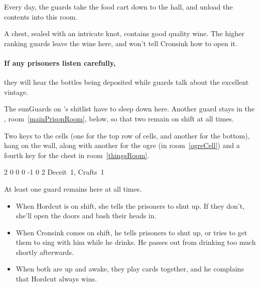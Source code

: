 
Every day, the guards take the food cart down to the hall, and unload the contents into this room.

A chest, sealed with an intricate knot, contains good quality wine.
The higher ranking guards leave the wine here, and won't tell Cronsink how to open it.

\paragraph{If any prisoners listen carefully,}
they will hear the bottles being deposited while guards talk about the excellent vintage.


The \glspl{sunGuard} on 's shitlist have to sleep down here.
Another guard stays in the , room~\ref{mainPrisonRoom}, below, so that two remain on shift at all times.

Two keys to the cells (one for the top row of cells, and another for the bottom), hang on the wall, along with another for the ogre (in room~\ref{ogreCell}) and a fourth key for the chest in room~\ref{thingsRoom}.

{2}%
{0}%
{{0}%
{0}%
{-1}}%
{0}%
{2}%
{
  Deceit~1, Crafts~1
  \knacks{\brawler, \berserker}
}%
{\shortsword}%
{}


At least one guard remains here at all times.
\begin{itemize}
  \item
  When Hordcut is on shift, she tells the prisoners to shut up.
  If they don't, she'll open the doors and bash their heads in.
  \item
  When Cronsink comes on shift, he tells prisoners to shut up, or tries to get them to sing with him while he drinks.
  He passes out from drinking too much shortly afterwards.
  \item
  When both are up and awake, they play cards together, and he complains that Hordcut always wins.
\end{itemize}



